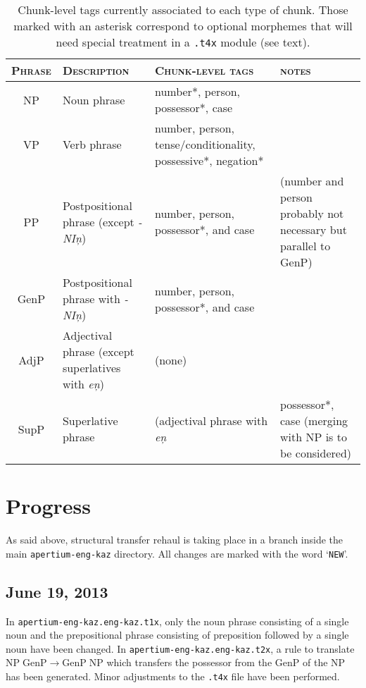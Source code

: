 \documentclass{article}
\begin{document}
\begin{table}
\begin{center}
\begin{tabular}{c|p{3cm}|p{3cm}|p{3.5cm}}
\hline\hline
\textsc{Phrase} & \textsc{Description} & \textsc{Chunk-level tags} & \textsc{notes} \\\hline
NP & Noun phrase & number*, person, possessor*, case \\\hline
VP & Verb phrase & number, person, tense/conditionality, possessive*, negation* \\\hline
PP & Postpositional phrase (except \emph{-NI\c{n}}) & number, person, possessor*, and case & (number and person probably not necessary but parallel to GenP) \\\hline
GenP & Postpositional phrase with \emph{-NI\c{n}}) & number, person, possessor*, and case \\\hline
AdjP & Adjectival phrase (except superlatives with \emph{e\c{n}}) & (none) \\\hline
SupP & Superlative phrase & (adjectival phrase with \emph{e\c{n}} & possessor*, case (merging with NP is to be considered) \\\hline
\end{tabular}
\end{center}
\caption{Chunk-level tags currently associated to each type of chunk. Those marked with an asterisk correspond to optional morphemes that will need special treatment in a \texttt{.t4x} module (see text).}
\label{tb:chunks}
\end{table}

\section{Progress}
As said above, structural transfer rehaul is taking place in a branch
inside the main \texttt{apertium-eng-kaz} directory. All changes are
marked with the word `\texttt{NEW}'.

\subsection{June 19, 2013}

In \texttt{apertium-eng-kaz.eng-kaz.t1x}, only the noun phrase consisting of a single noun and the prepositional phrase consisting of preposition followed by a single noun have been changed. In \texttt{apertium-eng-kaz.eng-kaz.t2x}, a rule to translate \(\mathrm{NP}\;\mathrm{GenP}\to\mathrm{GenP}\;\mathrm{NP}\) which transfers the possessor from the \(\mathrm{GenP}\)
 of the \(\mathrm{NP}\) has been generated. Minor adjustments to the \texttt{.t4x} file have been performed.
 
\end{document}
